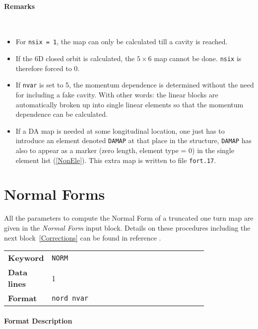 \paragraph{Remarks}~
\begin{itemize}
    \item For \texttt{nsix = 1}, the map can only be calculated till a cavity is reached.
    \item If the 6D closed orbit is calculated, the $5 \times 6$ map cannot be done. \texttt{nsix} is therefore forced to 0.
    \item If \texttt{nvar} is set to 5, the momentum dependence is determined without the need for including a fake cavity. With other words: the linear blocks are automatically broken up into single linear elements so that the momentum dependence can be calculated.
    \item If a DA map is needed at some longitudinal location, one just has to introduce an element denoted \texttt{DAMAP} at that place in the structure, \texttt{DAMAP} has also to appear as a marker (zero length, element type = 0) in the single element list (\ref{NonEle}). This extra map is written to file \texttt{fort.17}.
\end{itemize}

\section{Normal Forms} \label{Normal}

All the parameters to compute the Normal Form of a truncated one turn map are given in the \textit{Normal Form} input block.
Details on these procedures including the next block~\ref{Corrections} can be found in reference \cite{Massimo}.

\bigskip
\begin{tabular}{@{}lp{0.8\linewidth}}
    \textbf{Keyword}    & \texttt{NORM}\index{NORM} \\
    \textbf{Data lines} & 1 \\
    \textbf{Format}     & \texttt{nord nvar}
\end{tabular}

\paragraph{Format Description}~

